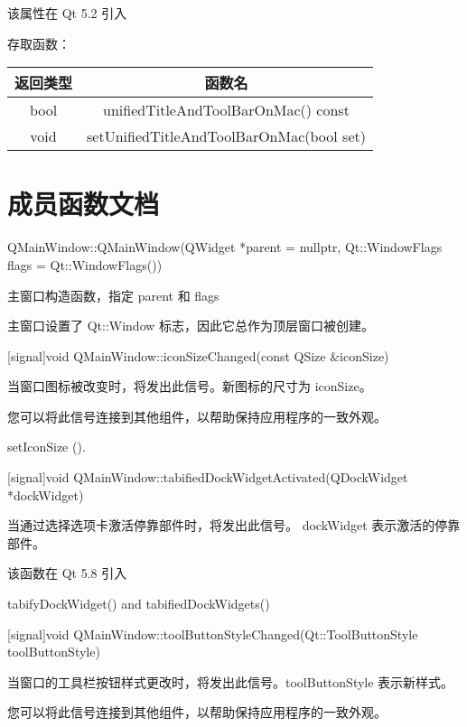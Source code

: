 该属性在 Qt 5.2 引入

存取函数：

\begin{tabular}{|c|c|}
    \hline
    返回类型 &	函数名 \\ 
    \hline  
    bool  &	unifiedTitleAndToolBarOnMac() const \\ 
    \hline
    void  &	setUnifiedTitleAndToolBarOnMac(bool set) \\ 
    \hline
    \end{tabular}

\section{成员函数文档}


QMainWindow::QMainWindow(QWidget *parent = nullptr, Qt::WindowFlags flags = Qt::WindowFlags())

主窗口构造函数，指定 parent 和 flags

主窗口设置了 Qt::Window 标志，因此它总作为顶层窗口被创建。

\splitLine

[signal]void QMainWindow::iconSizeChanged(const QSize \&iconSize)

当窗口图标被改变时，将发出此信号。新图标的尺寸为 iconSize。

您可以将此信号连接到其他组件，以帮助保持应用程序的一致外观。

\begin{notice}[另请参阅]
setIconSize ().
\end{notice}

\splitLine

[signal]void QMainWindow::tabifiedDockWidgetActivated(QDockWidget *dockWidget)

当通过选择选项卡激活停靠部件时，将发出此信号。 dockWidget 表示激活的停靠部件。

该函数在 Qt 5.8 引入

\begin{notice}[另请参阅]
tabifyDockWidget() and tabifiedDockWidgets()
\end{notice}

\splitLine

[signal]void QMainWindow::toolButtonStyleChanged(Qt::ToolButtonStyle toolButtonStyle)

当窗口的工具栏按钮样式更改时，将发出此信号。toolButtonStyle 表示新样式。

您可以将此信号连接到其他组件，以帮助保持应用程序的一致外观。

